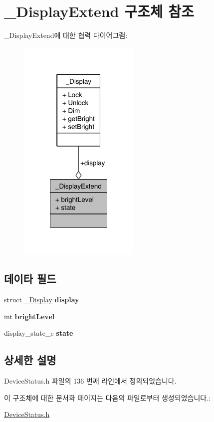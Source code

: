 \hypertarget{struct___display_extend}{\section{\-\_\-\-Display\-Extend 구조체 참조}
\label{struct___display_extend}
}


\-\_\-\-Display\-Extend에 대한 협력 다이어그램\-:\nopagebreak
\begin{figure}[H]
\begin{center}
\leavevmode
\includegraphics[width=164pt]{struct___display_extend__coll__graph}
\end{center}
\end{figure}
\subsection*{데이타 필드}
\begin{DoxyCompactItemize}
\item 
\hypertarget{struct___display_extend_a850328004642ca6438cafe1bb12a6c87}{struct \hyperlink{struct___display}{\-\_\-\-Display} {\bfseries display}}\label{struct___display_extend_a850328004642ca6438cafe1bb12a6c87}

\item 
\hypertarget{struct___display_extend_a1db5c4775375b4dc9b68fc36ba802802}{int {\bfseries bright\-Level}}\label{struct___display_extend_a1db5c4775375b4dc9b68fc36ba802802}

\item 
\hypertarget{struct___display_extend_ad6e14b7d3568c69a3a1170111d5657bf}{display\-\_\-state\-\_\-e {\bfseries state}}\label{struct___display_extend_ad6e14b7d3568c69a3a1170111d5657bf}

\end{DoxyCompactItemize}


\subsection{상세한 설명}


Device\-Status.\-h 파일의 136 번째 라인에서 정의되었습니다.



이 구조체에 대한 문서화 페이지는 다음의 파일로부터 생성되었습니다.\-:\begin{DoxyCompactItemize}
\item 
\hyperlink{_device_status_8h}{Device\-Status.\-h}\end{DoxyCompactItemize}
